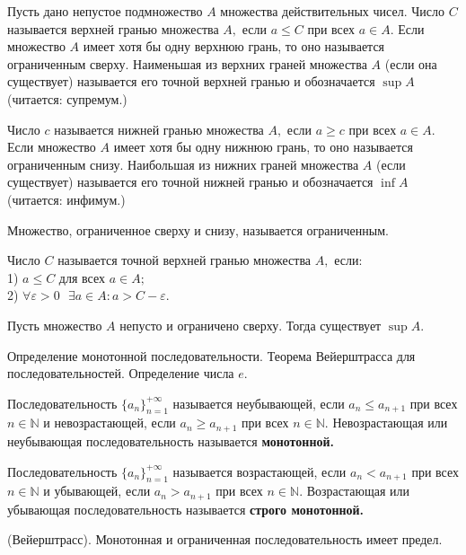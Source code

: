 \begin{definition}
	Пусть дано непустое подмножество $A$ множества
	действительных чисел. Число $C$ называется
	верхней гранью множества $A,$ если
	$a\leq C$ при всех $a\in A.$ Если множество
	$A$ имеет хотя бы одну верхнюю грань, то оно
	называется ограниченным сверху.
	Наименьшая из верхних граней множества
	$A$ (если она существует) называется его точной верхней гранью
	и обозначается $\sup A$ (читается: супремум.)

	Число $c$ называется
	нижней гранью множества $A,$ если
	$a\geq c$ при всех $a\in A.$ Если множество
	$A$ имеет хотя бы одну нижнюю грань, то оно
	называется ограниченным снизу.
	Наибольшая из нижних граней множества
	$A$ (если существует) называется его точной нижней гранью
	и обозначается $\inf A$ (читается: инфимум.)

	Множество, ограниченное сверху и снизу,
	называется ограниченным.
\end{definition}
\begin{definition}
	Число
	$C$ называется точной верхней гранью
	множества $A,$ если:\\1) $a\leq C$ для всех
	$a\in A;$\\ 2) $\forall\varepsilon>0
		\textrm{ }\exists a\in A: a>C-\varepsilon.$
\end{definition}

\begin{theorem}
	Пусть множество $A$ непусто и ограничено
	сверху. Тогда существует $\sup A.$
\end{theorem}

\newpage
\begin{problem} Определение монотонной последовательности. Теорема Вейерштрасса для последовательностей. Определение числа $e$.
\end{problem}

\begin{definition}
	Последовательность $\{a_n\}_{n=1}^{+\infty}$
	называется неубывающей, если $a_n\leq a_{n+1}$
	при всех $n\in\mathbb{N}$ и невозрастающей,
	если $a_n\geq a_{n+1}$ при всех $n\in\mathbb{N}.$
	Невозрастающая или неубывающая последовательность
	называется \textbf{монотонной.}

	Последовательность $\{a_n\}_{n=1}^{+\infty}$
	называется возрастающей, если $a_n<a_{n+1}$
	при всех $n\in\mathbb{N}$ и убывающей,
	если $a_n>a_{n+1}$ при всех $n\in\mathbb{N}.$
	Возрастающая или убывающая последовательность
	называется \textbf{ строго монотонной.}
\end{definition}
\begin{theorem} \textrm{(Вейерштрасс)}.
	Монотонная и ограниченная последовательность
	имеет предел.
\end{theorem}

